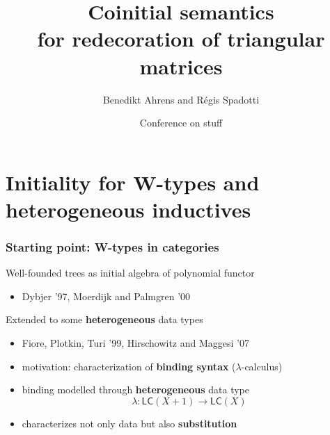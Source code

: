 \documentclass[
serif,
mathsans,
]
{beamer}
\title[Coinitial semantics for redecoration]{Coinitial semantics \\ for redecoration of triangular matrices}
\author{Benedikt Ahrens and R\'egis Spadotti}
\date[put date here]{Conference on stuff}
\institute[IRIT] %
{%
  Institut de Recherche en Informatique de Toulouse\\
   Universit\'e Paul Sabatier\\ ~ \\
}
\newcommand{\LC}{\mathsf{LC}}
\newcommand{\fat}[1]{\textbf{#1}}
\begin{document}
\begin{frame}
\titlepage

\end{frame}

\section{Initiality for W-types and heterogeneous inductives}

\begin{frame}
 \frametitle{Starting point: W-types in categories}
 
 \begin{block}{Well-founded trees as initial algebra of polynomial functor}
  \begin{itemize}
   \item Dybjer '97, Moerdijk and Palmgren '00
  \end{itemize}
 \end{block}

 \begin{block}{Extended to some \fat{heterogeneous} data types}
 
  \begin{itemize}
    \item Fiore, Plotkin, Turi '99, Hirschowitz and Maggesi '07
    \item motivation: characterization of \fat{binding syntax} ($\lambda$-calculus)
    \item binding modelled through \fat{heterogeneous} data type
           \[  \lambda : \LC(X + 1) \to \LC(X) \]
    \item characterizes not only data but also \fat{substitution} %
  \end{itemize}
 \end{block} 
\end{frame}
\end{document}
